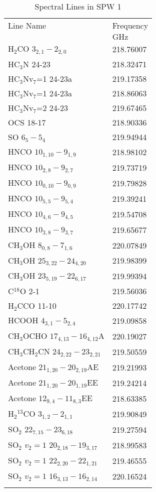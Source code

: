 \begin{table*}[htp]
\caption{Spectral Lines in SPW 1}
\begin{tabular}{ll}
\label{tab:linesspw1}
Line Name & Frequency \\
 & $\mathrm{GHz}$ \\
\hline
H$_2$CO $3_{2,1}-2_{2,0}$ & 218.76007 \\
HC$_3$N 24-23 & 218.32471 \\
HC$_3$Nv$_7$=1 24-23a & 219.17358 \\
HC$_3$Nv$_7$=1 24-23a & 218.86063 \\
HC$_3$Nv$_7$=2 24-23 & 219.67465 \\
OCS 18-17 & 218.90336 \\
SO $6_5-5_4$ & 219.94944 \\
HNCO $10_{1,10}-9_{1,9}$ & 218.98102 \\
HNCO $10_{2,8}-9_{2,7}$ & 219.73719 \\
HNCO $10_{0,10}-9_{0,9}$ & 219.79828 \\
HNCO $10_{5,5}-9_{5,4}$ & 219.39241 \\
HNCO $10_{4,6}-9_{4,5}$ & 219.54708 \\
HNCO $10_{3,8}-9_{3,7}$ & 219.65677 \\
CH$_3$OH $8_{0,8}-7_{1,6}$ & 220.07849 \\
CH$_3$OH $25_{3,22}-24_{4,20}$ & 219.98399 \\
CH$_3$OH $23_{5,19}-22_{6,17}$ & 219.99394 \\
C$^{18}$O 2-1 & 219.56036 \\
H$_2$CCO 11-10 & 220.17742 \\
HCOOH $4_{3,1}-5_{2,4}$ & 219.09858 \\
CH$_3$OCHO $17_{4,13}-16_{4,12}$A & 220.19027 \\
CH$_3$CH$_2$CN $24_{2,22}-23_{2,21}$ & 219.50559 \\
Acetone $21_{1,20}-20_{2,19}$AE & 219.21993 \\
Acetone $21_{1,20}-20_{1,19}$EE & 219.24214 \\
Acetone $12_{9,4}-11_{8,3}$EE & 218.63385 \\
H$_2$$^{13}$CO $3_{1,2}-2_{1,1}$ & 219.90849 \\
SO$_2$ $22_{7,15}-23_{6,18}$ & 219.27594 \\
SO$_2$ $v_2=1$ $20_{2,18}-19_{3,17}$ & 218.99583 \\
SO$_2$ $v_2=1$ $22_{2,20}-22_{1,21}$ & 219.46555 \\
SO$_2$ $v_2=1$ $16_{3,13}-16_{2,14}$ & 220.16524 \\
$$
\end{tabular}
\end{table*}
